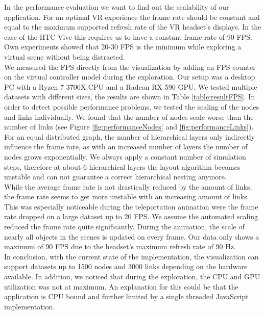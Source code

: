 In the performance evaluation we want to find out the scalability of our application. 
For an optimal VR experience the frame rate should be constant and equal to the maximum supported refresh rate of the VR headset's displays. In the case of the HTC Vive this requires us to have a constant frame rate of 90 FPS.
Own experiments showed that 20-30 FPS is the minimum while exploring a virtual scene without being distracted.
\\
We measured the FPS directly from the visualization by adding an FPS counter on the virtual controller model during the exploration. Our setup was a desktop PC with a Ryzen 7 3700X CPU and a Radeon RX 590 GPU. 
We tested multiple datasets with different sizes, the results are shown in Table \ref{table:resultFPS}. 
In order to detect possible performance problems, we tested the scaling of the nodes and links individually.
We found that the number of nodes scale worse than the number of links (see Figure \ref{fig:performanceNodes} and \ref{fig:performanceLinks}). 
For an equal distributed graph, the number of hierarchical layers only indirectly influence the frame rate, as with an increased number of layers the number of nodes grows exponentially.
We always apply a constant number of simulation steps, therefore at about 6 hierarchical layers the layout algorithm becomes unstable and can not guarantee a correct hierarchical nesting anymore.
\\
While the average frame rate is not drastically reduced by the amount of links, the frame rate seems to get more unstable with an increasing amount of links. 
This was especially noticeable during the teleportation animation were the frame rate dropped on a large dataset up to 20 FPS. 
We assume the automated scaling reduced the frame rate quite significantly. During the animation, the scale of nearly all objects in the scenes is updated on every frame.
Our data only shows a maximum of 90 FPS due to the headset's maximum refresh rate of 90 Hz.
\\
In conclusion, with the current state of the implementation, the visualization can support datasets up to 1500 nodes and 3000 links depending on the hardware available.
In addition, we noticed that during the exploration, the CPU and GPU utilization was not at maximum. An explanation for this could be that the application is CPU bound and further limited by a single threaded JavaScript implementation.

